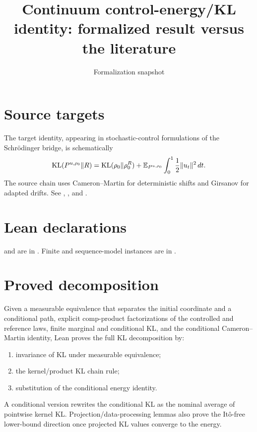 \title{Continuum control-energy/KL identity: formalized result versus the literature}
\author{}
\date{Formalization snapshot \snapshot}

\maketitle
{}
\section{Source targets}
The target identity, appearing in stochastic-control formulations of the Schr\"odinger bridge, is schematically
\[
 \operatorname{KL}(P^{u,\rho_0}\Vert R)
 =\operatorname{KL}(\rho_0\Vert\rho_0^R)
 +\mathbb E_{P^{u,\rho_0}}\int_0^1\frac12\lVert u_t\rVert^2\,dt.
\]
The source chain uses Cameron--Martin for deterministic shifts and Girsanov for adapted drifts.  See
,
, and
.

\section{Lean declarations}
 and
 are in
.  Finite and sequence-model instances are in .

\section{Proved decomposition}
Given a measurable equivalence that separates the initial coordinate and a conditional path, explicit comp-product factorizations of the controlled and reference laws, finite marginal and conditional KL, and the conditional Cameron--Martin identity, Lean proves the full KL decomposition by:
\begin{enumerate}[leftmargin=2em]
\item invariance of KL under measurable equivalence;
\item the kernel/product KL chain rule;
\item substitution of the conditional energy identity.
\end{enumerate}
A conditional version rewrites the conditional KL as the nominal average of pointwise kernel KL.  Projection/data-processing lemmas also prove the It\^o-free lower-bound direction once projected KL values converge to the energy.

